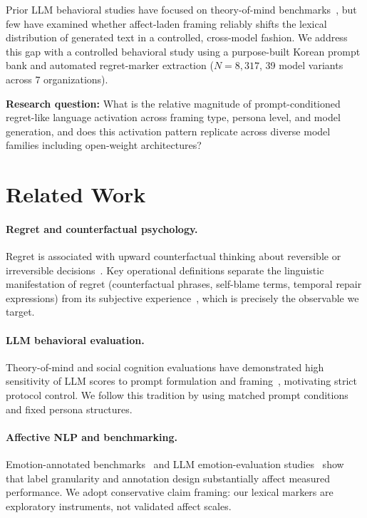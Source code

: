 \documentclass[conference,10pt]{IEEEtran}
\begin{document}
Prior LLM behavioral studies have focused on theory-of-mind benchmarks~\cite{kosinski2024tom, tombench2024}, but few have examined whether affect-laden framing reliably shifts the lexical distribution of generated text in a controlled, cross-model fashion.
We address this gap with a controlled behavioral study using a purpose-built Korean prompt bank and automated regret-marker extraction ($N=8{,}317$, 39 model variants across 7 organizations).

\textbf{Research question:} What is the relative magnitude of prompt-conditioned regret-like language activation across framing type, persona level, and model generation, and does this activation pattern replicate across diverse model families including open-weight architectures?

\section{Related Work}

\paragraph{Regret and counterfactual psychology.}
Regret is associated with upward counterfactual thinking about reversible or irreversible decisions~\cite{roese2017, byrne2016, kahneman1986norm}.
Key operational definitions separate the linguistic manifestation of regret (counterfactual phrases, self-blame terms, temporal repair expressions) from its subjective experience~\cite{bell1982, loomes1982, zeelenberg1998, gilovichmedvec1995}, which is precisely the observable we target.

\paragraph{LLM behavioral evaluation.}
Theory-of-mind and social cognition evaluations have demonstrated high sensitivity of LLM scores to prompt formulation and framing~\cite{ullman2023, shapira2023cleverhans, schaeffer2023mirage}, motivating strict protocol control.
We follow this tradition by using matched prompt conditions and fixed persona structures.

\paragraph{Affective NLP and benchmarking.}
Emotion-annotated benchmarks~\cite{rashkin2019, demszky2020} and LLM emotion-evaluation studies~\cite{emobench2024, fragileemotionreasoning2025} show that label granularity and annotation design substantially affect measured performance.
We adopt conservative claim framing: our lexical markers are exploratory instruments, not validated affect scales.
\end{document}

